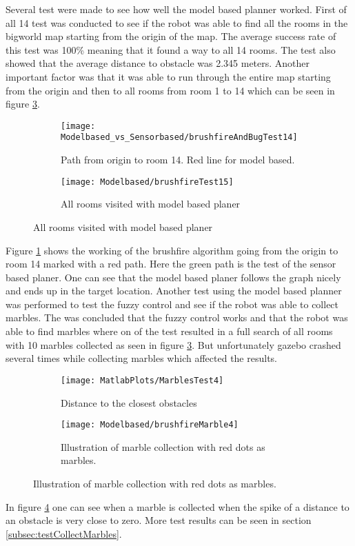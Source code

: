 \documentclass[../Head/Main.tex]{subfiles}
\begin{document}
Several test were made to see how well the model based planner worked. First of all 14 test was conducted to see if the robot was able to find all the rooms in the bigworld map starting from the origin of the map. The average success rate of this test was 100\% meaning that it found a way to all 14 rooms. The test also showed that the average distance to obstacle was 2.345 meters. Another important factor was that it was able to run through the entire map starting from the origin and then to all rooms from room 1 to 14 which can be seen in figure \ref{fig:brushfireCompletePath}. 

  \begin{figure}[H]
   \begin{subfigure}[b]{0.49\textwidth}
    \centering
    \texttt{[image: Modelbased\_vs\_Sensorbased/brushfireAndBugTest14]}
    \caption{Path from origin to room 14. Red line for model based.}
    \label{fig:brushfireToRoom14}
  \end{subfigure}
  \hfill
   \begin{subfigure}[b]{0.49\textwidth}
    \centering
    \texttt{[image: Modelbased/brushfireTest15]}
    \caption{All rooms visited with model based planer}
    \label{fig:brushfireCompletePath}
  \end{subfigure}
  \end{figure}  

Figure \ref{fig:brushfireToRoom14} shows the working of the brushfire algorithm going from the origin to room 14 marked with a red path. Here the green path is the test of the sensor based planer. One can see that the model based planer follows the graph nicely and ends up in the target location. Another test using the model based planner was performed to test the fuzzy control and see if the robot was able to collect marbles. The was concluded that the fuzzy control works and that the robot was able to find marbles where on of the test resulted in a full search of all rooms with 10 marbles collected as seen in figure \ref{fig:brushfireCompletePath}. But unfortunately gazebo crashed several times while collecting marbles which affected the results.
  \begin{figure}[H]
   \begin{subfigure}[b]{0.49\textwidth}
    \centering
    \texttt{[image: MatlabPlots/MarblesTest4]}
    \caption{Distance to the closest obstacles}
    \label{fig:matlabPlotMarbletest14}
  \end{subfigure}
  \hfill
   \begin{subfigure}[b]{0.49\textwidth}
    \centering
    \texttt{[image: Modelbased/brushfireMarble4]}
    \caption{Illustration of marble collection with red dots as marbles.}
    \label{fig:brushfireMarbleFindingTest}
  \end{subfigure}
  \end{figure}  

In figure \ref{fig:matlabPlotMarbletest14} one can see when a marble is collected when the spike of a distance to an obstacle is very close to zero. More test results can be seen in section \ref{subsec:testCollectMarbles}.
\end{document}
